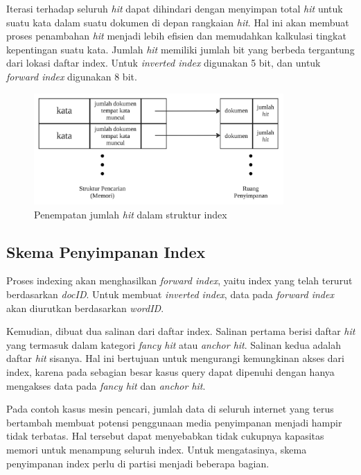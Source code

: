 Iterasi terhadap seluruh \emph{hit} dapat dihindari dengan menyimpan total
\emph{hit} untuk suatu kata dalam suatu dokumen di depan rangkaian \emph{hit}.
Hal ini akan membuat proses penambahan \emph{hit} menjadi lebih efisien dan
memudahkan kalkulasi tingkat kepentingan suatu kata. Jumlah \textit{hit}
memiliki jumlah bit yang berbeda tergantung dari lokasi daftar index. Untuk 
\textit{inverted index} digunakan 5 bit, dan untuk \textit{forward index}
digunakan 8 bit.

\begin{figure}[H]
  \centering{}
	\includegraphics[width=0.85\textwidth]{gambar/hubunganStrukturPencarian}
  \caption{Penempatan jumlah \emph{hit} dalam struktur index}
\end{figure}

\subsection{Skema Penyimpanan Index}

Proses indexing akan menghasilkan \emph{forward index}, yaitu index yang telah
terurut berdasarkan \textit{docID}. Untuk membuat \textit{inverted index}, data
pada \textit{forward index} akan diurutkan berdasarkan \textit{wordID}.

Kemudian, dibuat dua salinan dari daftar index. Salinan pertama berisi daftar
\emph{hit} yang termasuk dalam kategori \emph{fancy hit} atau \emph{anchor hit}.
Salinan kedua adalah daftar \emph{hit} sisanya. Hal ini bertujuan untuk
mengurangi kemungkinan akses dari index, karena pada sebagian besar kasus query
dapat dipenuhi dengan hanya mengakses data pada \emph{fancy hit} dan
\emph{anchor hit}.

Pada contoh kasus mesin pencari, jumlah data di seluruh internet yang terus
bertambah membuat potensi penggunaan media penyimpanan menjadi hampir tidak
terbatas. Hal tersebut dapat menyebabkan tidak cukupnya kapasitas memori untuk
menampung seluruh index. Untuk mengatasinya, skema penyimpanan index perlu di
partisi menjadi beberapa bagian.

